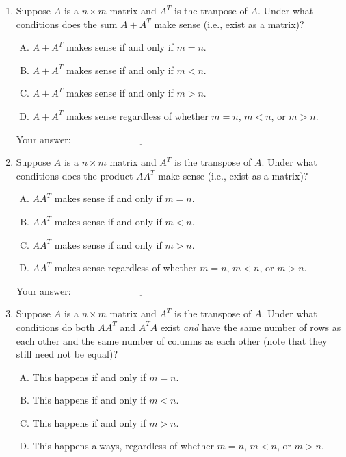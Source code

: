 \documentclass[10pt]{amsart}
\begin{document}
\begin{enumerate}
\item Suppose $A$ is a $n \times m$ matrix and $A^T$ is the tranpose
  of $A$. Under what conditions does the sum $A + A^T$ make sense
  (i.e., exist as a matrix)?

  \begin{enumerate}[(A)]
  \item $A + A^T$ makes sense if and only if $m = n$.
  \item $A + A^T$ makes sense if and only if $m < n$.
  \item $A + A^T$ makes sense if and only if $m > n$.
  \item $A + A^T$ makes sense regardless of whether $m = n$, $m < n$,
    or $m > n$.
  \end{enumerate} 

  \vspace{0.1in}
  Your answer: $\underline{\qquad\qquad\qquad\qquad\qquad\qquad\qquad}$
  \vspace{0.1in}

\item Suppose $A$ is a $n \times m$ matrix and $A^T$ is the transpose
  of $A$. Under what conditions does the product $AA^T$ make sense
  (i.e., exist as a matrix)?

  \begin{enumerate}[(A)]
  \item $AA^T$ makes sense if and only if $m = n$.
  \item $AA^T$ makes sense if and only if $m < n$.
  \item $AA^T$ makes sense if and only if $m > n$.
  \item $AA^T$ makes sense regardless of whether $m = n$, $m < n$,
    or $m > n$.
  \end{enumerate} 

  \vspace{0.1in}
  Your answer: $\underline{\qquad\qquad\qquad\qquad\qquad\qquad\qquad}$
  \vspace{0.1in}

\item Suppose $A$ is a $n \times m$ matrix and $A^T$ is the transpose
  of $A$. Under what conditions do both $AA^T$ and $A^TA$ exist {\em
    and} have the same number of rows as each other and the same
  number of columns as each other (note that they still need not be
  equal)?

  \begin{enumerate}[(A)]
  \item This happens if and only if $m = n$.
  \item This happens if and only if $m < n$.
  \item This happens if and only if $m > n$.
  \item This happens always, regardless of whether $m = n$, $m < n$,
    or $m > n$.
  \end{enumerate} 


\end{enumerate}
\end{document}

